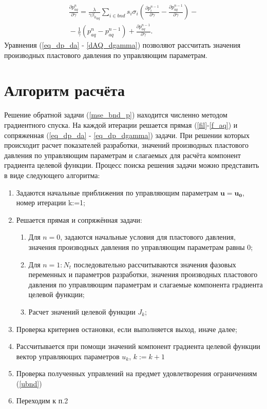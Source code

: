 \documentclass[14pt]{article}
\begin{document}
\begin{multline} \label{dAQ_dgamma}
\frac{\partial p_{aq}^n}{\partial \gamma} 
= \frac{\lambda}{\gamma{\beta_0}_{aq}}\sum_{i \in bnd}s_i\sigma_i\left(\frac{\partial p_i^{n-1}}{\partial \gamma}-\frac{\partial p_{aq}^{n-1}}{\partial \gamma}\right)  -  {} \\
{} - \frac{1}{\gamma}\left(p_{aq}^n - p_{aq}^{n-1}\right)
+ \frac{\partial p_{aq}^{n-1}}{\partial \gamma}.
\end{multline}
Уравнения (\ref{eq_dp_da} - \ref{dAQ_dgamma}) позволяют рассчитать значения производных пластового давления по управляющим параметрам. 

\section{Алгоритм расчёта}
Решение обратной задачи (\ref{mse_bnd_p}) находится численно методом градиентного спуска. На каждой итерации решается прямая (\ref{fil}-\ref{f_aq}) и сопряженная (\ref{eq_dp_da} - \ref{eq_dp_dgamma}) задачи. При решении которых происходит расчет показателей разработки, значений производных пластового давления по управляющим параметрам и слагаемых для расчёта компонент градиента  целевой функции. Процесс поиска решения задачи можно представить в виде следующего алгоритма:

\begin{enumerate} 
	\item Задаются начальные приближения по управляющим параметрам $ \boldsymbol{u}  = \boldsymbol{u_0}$, номер итерации k:=1;
	\item \label{list_1_2}Решается прямая и сопряжённая задачи:
	\begin{enumerate}
		\item \label{list_2_a} Для $ n=0 $, задаются начальные условия для пластового давления, значения производных давления по управляющим параметрам равны 0;
		\item Для $ n=1:N_t $ последовательно рассчитываются значения фазовых переменных и параметров разработки, значения производных пластового давления по управляющим параметрам и слагаемые компонента градиента целевой функции;
		\item Расчет значений целевой функции $ J_k $;
	\end{enumerate}
	\item Проверка критериев остановки, если выполняется выход, иначе далее;
	\item Рассчитывается при помощи значений компонент градиента целевой функции вектор управляющих параметров $ u_k $, $k := k+1$
	\item Проверка полученных управлений на предмет удовлетворения ограничениям (\ref{ubnd})
	\item Переходим к п.2
\end{enumerate}
\end{document}
